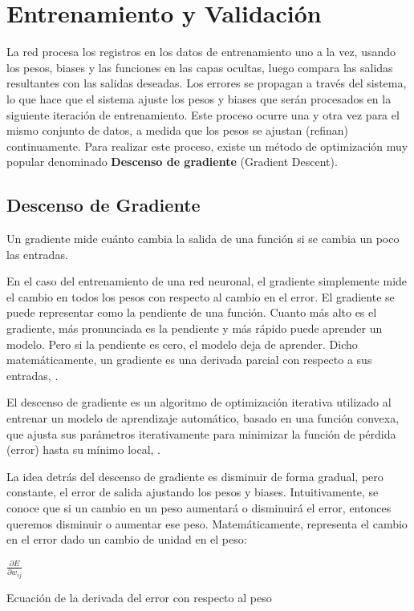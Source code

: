\newpage
\section{Entrenamiento y Validación}

	La red procesa los registros en los datos de entrenamiento uno a la vez, usando los pesos, biases y las funciones en las capas ocultas, luego compara las salidas resultantes con las salidas deseadas. Los errores se propagan a través del sistema, lo que hace que el sistema ajuste los pesos y biases que serán procesados en la siguiente iteración de entrenamiento. Este proceso ocurre una y otra vez para el mismo conjunto de datos, a medida que los pesos se ajustan (refinan) continuamente. Para realizar este proceso, existe un método de optimización muy popular denominado {\bf Descenso de gradiente} (Gradient Descent).

	\subsection{Descenso de Gradiente}

		Un gradiente mide cuánto cambia la salida de una función si se cambia un poco las entradas.

		En el caso del entrenamiento de una red neuronal, el gradiente simplemente mide el cambio en todos los pesos con respecto al cambio en el error. El gradiente se puede representar como la pendiente de una función. Cuanto más alto es el gradiente, más pronunciada es la pendiente y más rápido puede aprender un modelo. Pero si la pendiente es cero, el modelo deja de aprender. Dicho matemáticamente, un gradiente es una derivada parcial con respecto a sus entradas, \citep{gradient}.

		El descenso de gradiente es un algoritmo de optimización iterativa utilizado al entrenar un modelo de aprendizaje automático, basado en una función convexa, que ajusta sus parámetros iterativamente para minimizar la función de pérdida (error) hasta su mínimo local, \citep{gradient}.

		La idea detrás del descenso de gradiente es disminuir de forma gradual, pero constante, el error de salida ajustando los pesos y biases. Intuitivamente, se conoce que si un cambio en un peso aumentará o disminuirá el error, entonces queremos disminuir o aumentar ese peso. Matemáticamente, representa el cambio en el error dado un cambio de unidad en el peso:

		\begingroup\makeatletter{}\check@mathfonts
		\begin{center}
		$ \frac{{\partial E}}{\partial w_{ij}}$
		\end{center}
		\begin{center}
		{\small{Ecuación de la derivada del error con respecto al peso}}
		\end{center}
		\endgroup
		

